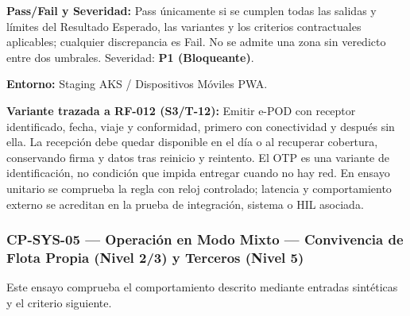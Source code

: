 \par\noindent\textbf{Pass/Fail y Severidad:} Pass únicamente si se cumplen todas las salidas y límites del Resultado Esperado, las variantes y los criterios contractuales aplicables; cualquier discrepancia es Fail. No se admite una zona sin veredicto entre dos umbrales. Severidad: \textbf{P1 (Bloqueante)}.\par
\par\noindent\textbf{Entorno:} Staging AKS / Dispositivos Móviles PWA.\par







\par\noindent\textbf{Variante trazada a RF-012 (S3/T-12):} Emitir e-POD con receptor identificado, fecha, viaje y conformidad, primero con conectividad y después sin ella. La recepción debe quedar disponible en el día o al recuperar cobertura, conservando firma y datos tras reinicio y reintento. El OTP es una variante de identificación, no condición que impida entregar cuando no hay red. En ensayo unitario se comprueba la regla con reloj controlado; latencia y comportamiento externo se acreditan en la prueba de integración, sistema o HIL asociada.\par
\subsubsection*{CP-SYS-05 — Operación en Modo Mixto — Convivencia de Flota Propia (Nivel 2/3) y Terceros (Nivel 5)}\label{sec:9-cp-sys-05}

Este ensayo comprueba el comportamiento descrito mediante entradas sintéticas y el criterio siguiente.

